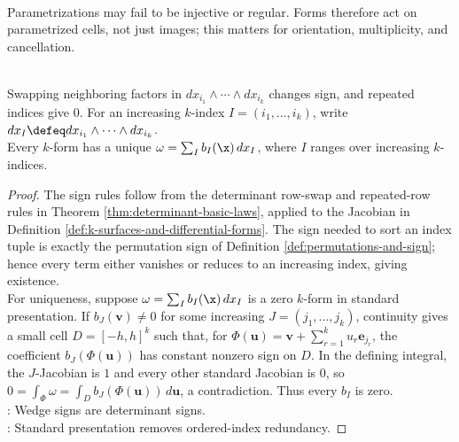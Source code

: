 \begin{remark} \label{rem:parametrized-cells-not-images} \\
Parametrizations may fail to be injective or regular. Forms therefore act on parametrized cells, not just images; this matters for orientation, multiplicity, and cancellation.
\end{remark}

\begin{proposition} \label{prop:basic-forms-standard-presentation} \\
Swapping neighboring factors in $dx_{i_1}\wedge\cdots\wedge dx_{i_k}$ changes sign, and repeated indices give $0$. For an increasing $k$-index $I=(i_1,\ldots,i_k)$, write $dx_I\defeq dx_{i_1}\wedge\cdots\wedge dx_{i_k}$.\\
Every $k$-form has a unique  $\omega=\sum_I b_I(\x)\,dx_I$, where $I$ ranges over increasing $k$-indices.
\begin{proof}
The sign rules follow from the determinant row-swap and repeated-row rules in Theorem \ref{thm:determinant-basic-laws}, applied to the Jacobian in Definition \ref{def:k-surfaces-and-differential-forms}. The sign needed to sort an index tuple is exactly the permutation sign of Definition \ref{def:permutations-and-sign}; hence every term either vanishes or reduces to an increasing index, giving existence.\\
For uniqueness, suppose $\omega=\sum_I b_I(\x)\,dx_I$ is a zero $k$-form in standard presentation. If $b_J(\mathbf{v})\neq0$ for some increasing $J=(j_1,\ldots,j_k)$, continuity gives a small cell $D=[-h,h]^k$ such that, for $\Phi(\mathbf{u})=\mathbf{v}+\sum\limits_{r=1}^{k}u_r\mathbf{e}_{j_r}$, the coefficient $b_J(\Phi(\mathbf{u}))$ has constant nonzero sign on $D$. In the defining integral, the $J$-Jacobian is $1$ and every other standard Jacobian is $0$, so $0=\int_{\Phi}\omega=\int_D b_J(\Phi(\mathbf{u}))\,d\mathbf{u}$, a contradiction. Thus every $b_I$ is zero.\\
: Wedge signs are determinant signs.\\
: Standard presentation removes ordered-index redundancy.
\end{proof}
\end{proposition}

